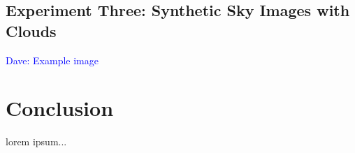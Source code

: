 \documentclass[11pt]{article}
\newcommand{\dnote}[1]{\textcolor{blue}{Dave: #1}}
\begin{document}
\begin{figure}
\begin{center}
\end{center}
\end{figure}

\subsection{Experiment Three: Synthetic Sky Images with Clouds}

\dnote{Example image}


\section{Conclusion}


lorem ipsum...














\footnotesize{}
\end{document}
